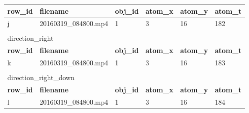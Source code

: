 \begin{table}[tb!]
\begin{tabular}{llllll}
  \multicolumn{1}{|l|}{\textbf{row\_id}} & \multicolumn{1}{l|}{\textbf{filename}}    & \multicolumn{1}{l|}{\textbf{obj\_id}} & \multicolumn{1}{l|}{\textbf{atom\_x}} & \multicolumn{1}{l|}{\textbf{atom\_y}} & \multicolumn{1}{l|}{\textbf{atom\_t}} \\ \hline
  \multicolumn{1}{|l|}{j}                & \multicolumn{1}{l|}{20160319\_084800.mp4} & \multicolumn{1}{l|}{1}                & \multicolumn{1}{l|}{3}                & \multicolumn{1}{l|}{16}               & \multicolumn{1}{l|}{182}              \\ \hline
                                         &                                           &                                       &                                       &                                       &                                       \\
  \multicolumn{6}{l}{{ direction\_right}}                                                                                                                                                                                                         \\ \hline
  \multicolumn{1}{|l|}{\textbf{row\_id}} & \multicolumn{1}{l|}{\textbf{filename}}    & \multicolumn{1}{l|}{\textbf{obj\_id}} & \multicolumn{1}{l|}{\textbf{atom\_x}} & \multicolumn{1}{l|}{\textbf{atom\_y}} & \multicolumn{1}{l|}{\textbf{atom\_t}} \\ \hline
  \multicolumn{1}{|l|}{k}                & \multicolumn{1}{l|}{20160319\_084800.mp4} & \multicolumn{1}{l|}{1}                & \multicolumn{1}{l|}{3}                & \multicolumn{1}{l|}{16}               & \multicolumn{1}{l|}{183}              \\ \hline
                                         &                                           &                                       &                                       &                                       &                                       \\
  \multicolumn{6}{l}{{ direction\_right\_down}}                                                                                                                                                                                                   \\ \hline
  \multicolumn{1}{|l|}{\textbf{row\_id}} & \multicolumn{1}{l|}{\textbf{filename}}    & \multicolumn{1}{l|}{\textbf{obj\_id}} & \multicolumn{1}{l|}{\textbf{atom\_x}} & \multicolumn{1}{l|}{\textbf{atom\_y}} & \multicolumn{1}{l|}{\textbf{atom\_t}} \\ \hline
  \multicolumn{1}{|l|}{l}                & \multicolumn{1}{l|}{20160319\_084800.mp4} & \multicolumn{1}{l|}{1}                & \multicolumn{1}{l|}{3}                & \multicolumn{1}{l|}{16}               & \multicolumn{1}{l|}{184}              \\ \hline
  \end{tabular}
\end{table}

